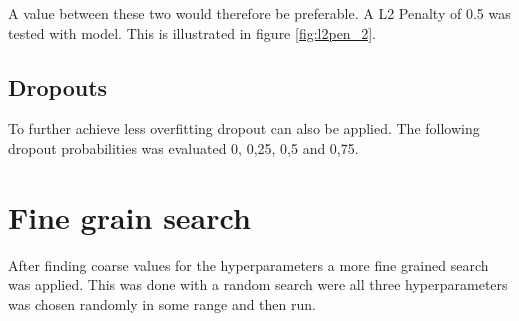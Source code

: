 

A value between these two  would therefore be preferable. A L2 Penalty of 0.5 was tested with model. This is illustrated in figure \ref{fig:l2pen_2}.


\subsection{Dropouts}
To further achieve less overfitting dropout can also be applied. The following dropout probabilities was evaluated 0, 0,25, 0,5 and 0,75.

\section{Fine grain search}
After finding coarse values for the hyperparameters a more fine grained search was applied. This was done with a random search were all three hyperparameters was chosen randomly in some range and then run.


